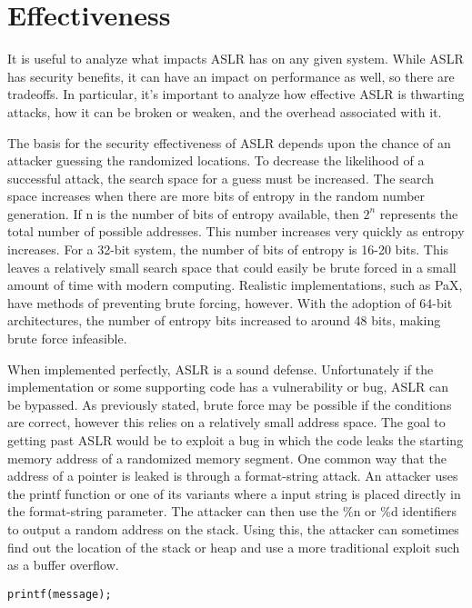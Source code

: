\section{Effectiveness}
\label{s:effectiveness} %

It is useful to analyze what impacts ASLR has on any given system. While ASLR has security benefits, it can have an impact on performance as well, so there are tradeoffs. In particular, it’s important to analyze how effective ASLR is thwarting attacks, how it can be broken or weaken, and the overhead associated with it.

The basis for the security effectiveness of ASLR depends upon the chance of an attacker guessing the randomized locations. To decrease the likelihood of a successful attack, the search space for a guess must be increased. The search space increases when there are more bits of entropy in the random number generation. If n is the number of bits of entropy available, then $2^n$ represents the total number of possible addresses. This number increases very quickly as entropy increases. For a 32-bit system, the number of bits of entropy is 16-20 bits. This leaves a relatively small search space that could easily be brute forced in a small amount of time with modern computing. Realistic implementations, such as PaX, have methods of preventing brute forcing, however. With the adoption of 64-bit architectures, the number of entropy bits increased to around 48 bits, making brute force infeasible.

When implemented perfectly, ASLR is a sound defense. Unfortunately if the implementation or some supporting code has a vulnerability or bug, ASLR can be bypassed. As previously stated, brute force may be possible if the conditions are correct, however this relies on a relatively small address space. The goal to getting past ASLR would be to exploit a bug in which the code leaks the starting memory address of a randomized memory segment. One common way that the address of a pointer is leaked is through a format-string attack. \cite{bhatkar2003address} An attacker uses the printf function or one of its variants where a input string is placed directly in the format-string parameter. The attacker can then use the \%n or \%d identifiers to output a random address on the stack. Using this, the attacker can sometimes find out the location of the stack or heap and use a more traditional exploit such as a buffer overflow.

\begin{lstlisting}[caption=A dangerous printf statement]
printf(message);
\end{lstlisting}

